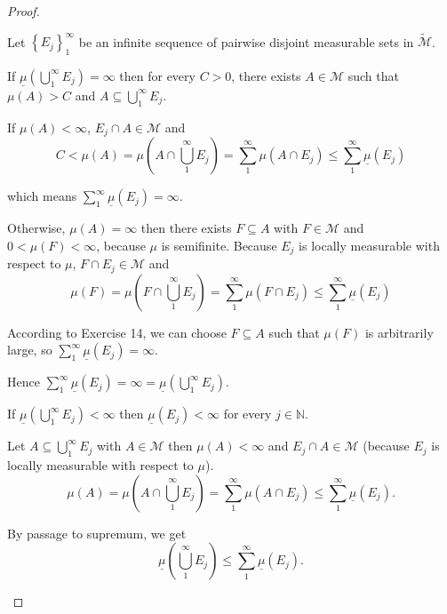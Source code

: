 \begin{proof}
\begin{enumerate}[itemsep=0pt,label=\textbf{\alph*.}]
              Let \( {\left\{ E_{j} \right\}}_{1}^{\infty} \) be an infinite sequence of pairwise disjoint measurable sets in \( \widetilde{\mathcal{M}} \).

              If \( \underline{\mu}\left( \bigcup_{1}^{\infty} E_{j} \right) = \infty \) then for every \( C > 0 \), there exists \( A \in \mathcal{M} \) such that \( \mu(A) > C \) and \( A \subseteq \bigcup_{1}^{\infty} E_{j} \).

              If \( \mu(A) < \infty \), \( E_{j} \cap A \in \mathcal{M} \) and
              \[
                  C < \mu(A) = \mu\left( A \cap \bigcup_{1}^{\infty} E_{j} \right) = \sum_{1}^{\infty} \mu(A \cap E_{j}) \le \sum_{1}^{\infty} \underline{\mu}(E_{j})
              \]

              which means \( \sum_{1}^{\infty} \underline{\mu}(E_{j}) = \infty \).

              Otherwise, \( \mu(A) = \infty \) then there exists \( F \subseteq A \) with \( F \in \mathcal{M} \) and \( 0 < \mu(F) < \infty \), because \( \mu \) is semifinite. Because \( E_{j} \) is locally measurable with respect to \( \mu \), \( F \cap E_{j} \in \mathcal{M} \) and
              \[
                  \mu(F) = \mu\left( F \cap \bigcup_{1}^{\infty} E_{j} \right) = \sum_{1}^{\infty} \mu(F \cap E_{j}) \le \sum_{1}^{\infty} \underline{\mu}(E_{j})
              \]


              According to Exercise 14, we can choose \( F \subseteq A \) such that \( \mu(F) \) is arbitrarily large, so \( \sum_{1}^{\infty} \underline{\mu}(E_{j}) = \infty \).

              Hence \( \sum_{1}^{\infty} \underline{\mu}(E_{j}) = \infty = \underline{\mu}\left( \bigcup_{1}^{\infty} E_{j} \right) \).

              \bigskip

              If \( \underline{\mu}\left( \bigcup_{1}^{\infty} E_{j} \right) < \infty \) then \( \underline{\mu}(E_{j}) < \infty \) for every \( j \in \mathbb{N} \).

              Let \( A \subseteq \bigcup_{1}^{\infty} E_{j} \) with \( A \in \mathcal{M} \) then \( \mu(A) < \infty \) and \( E_{j} \cap A \in \mathcal{M} \) (because \( E_{j} \) is locally measurable with respect to \( \mu \)).
              \[
                  \mu(A) = \mu\left( A \cap \bigcup_{1}^{\infty} E_{j} \right) = \sum_{1}^{\infty} \mu(A \cap E_{j}) \le \sum_{1}^{\infty} \underline{\mu}(E_{j}).
              \]

              By passage to supremum, we get
              \[
                  \underline{\mu}\left( \bigcup_{1}^{\infty} E_{j} \right) \le \sum_{1}^{\infty} \underline{\mu}(E_{j}).
              \]


\end{enumerate}
\end{proof}
